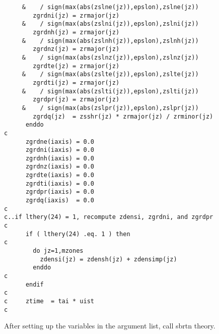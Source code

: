 \begin{verbatim}
     &    / sign(max(abs(zslne(jz)),epslon),zslne(jz))
        zgrdni(jz) = zrmajor(jz)
     &    / sign(max(abs(zslni(jz)),epslon),zslni(jz))
        zgrdnh(jz) = zrmajor(jz)
     &    / sign(max(abs(zslnh(jz)),epslon),zslnh(jz))
        zgrdnz(jz) = zrmajor(jz)
     &    / sign(max(abs(zslnz(jz)),epslon),zslnz(jz))
        zgrdte(jz) = zrmajor(jz)
     &    / sign(max(abs(zslte(jz)),epslon),zslte(jz))
        zgrdti(jz) = zrmajor(jz)
     &    / sign(max(abs(zslti(jz)),epslon),zslti(jz))
        zgrdpr(jz) = zrmajor(jz)
     &    / sign(max(abs(zslpr(jz)),epslon),zslpr(jz))
        zgrdq(jz)  = zsshr(jz) * zrmajor(jz) / zrminor(jz)
      enddo
c
      zgrdne(iaxis) = 0.0
      zgrdni(iaxis) = 0.0
      zgrdnh(iaxis) = 0.0
      zgrdnz(iaxis) = 0.0
      zgrdte(iaxis) = 0.0
      zgrdti(iaxis) = 0.0
      zgrdpr(iaxis) = 0.0
      zgrdq(iaxis)  = 0.0
c
c..if lthery(24) = 1, recompute zdensi, zgrdni, and zgrdpr
c
      if ( lthery(24) .eq. 1 ) then
c
        do jz=1,mzones
          zdensi(jz) = zdensh(jz) + zdensimp(jz)
        enddo
c
      endif
c
c     ztime  = tai * uist
c
\end{verbatim}

After setting up the variables in the argument list, call sbrtn theory.


